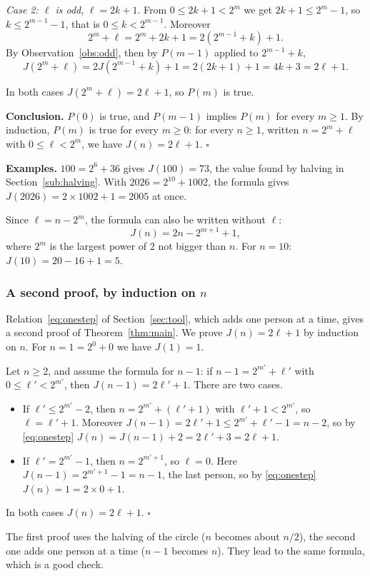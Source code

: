 \emph{Case 2: $\ell$ is odd}, $\ell=2k+1$. From $0\leq2k+1<2^m$ we get
$2k+1\leq2^m-1$, so $k\leq2^{m-1}-1$, that is $0\leq k<2^{m-1}$. Moreover
\[
2^m+\ell=2^m+2k+1=2\left(2^{m-1}+k\right)+1 .
\]
By Observation~\ref{obs:odd}, then by $P(m-1)$ applied to $2^{m-1}+k$,
\[
J(2^m+\ell)=2J\!\left(2^{m-1}+k\right)+1=2(2k+1)+1=4k+3=2\ell+1 .
\]

In both cases $J(2^m+\ell)=2\ell+1$, so $P(m)$ is true.

\textbf{Conclusion.} $P(0)$ is true, and $P(m-1)$ implies $P(m)$ for every
$m\geq1$. By induction, $P(m)$ is true for every $m\geq0$: for every $n\geq1$,
written $n=2^m+\ell$ with $0\leq\ell<2^m$, we have $J(n)=2\ell+1$.
\hfill$\square$

\textbf{Examples.} $100=2^6+36$ gives $J(100)=73$, the value found by halving
in Section~\ref{sub:halving}. With $2026=2^{10}+1002$, the formula gives
$J(2026)=2\times1002+1=2005$ at once.

Since $\ell=n-2^m$, the formula can also be written without $\ell$:
\[
J(n)=2n-2^{m+1}+1,
\]
where $2^m$ is the largest power of $2$ not bigger than $n$. For $n=10$:
$J(10)=20-16+1=5$.

\subsubsection{A second proof, by induction on \texorpdfstring{$n$}{n}}

Relation~\eqref{eq:onestep} of Section~\ref{sec:tool}, which adds one person
at a time, gives a second proof of Theorem~\ref{thm:main}. We prove
$J(n)=2\ell+1$ by induction on $n$. For $n=1=2^0+0$ we have $J(1)=1$.

Let $n\geq2$, and assume the formula for $n-1$: if $n-1=2^{m'}+\ell'$ with
$0\leq\ell'<2^{m'}$, then $J(n-1)=2\ell'+1$. There are two cases.
\begin{itemize}
  \item If $\ell'\leq2^{m'}-2$, then $n=2^{m'}+(\ell'+1)$ with
        $\ell'+1<2^{m'}$, so $\ell=\ell'+1$. Moreover
        $J(n-1)=2\ell'+1\leq2^{m'}+\ell'-1=n-2$, so by \eqref{eq:onestep}
        $J(n)=J(n-1)+2=2\ell'+3=2\ell+1$.
  \item If $\ell'=2^{m'}-1$, then $n=2^{m'+1}$, so $\ell=0$. Here
        $J(n-1)=2^{m'+1}-1=n-1$, the last person, so by \eqref{eq:onestep}
        $J(n)=1=2\times0+1$.
\end{itemize}
In both cases $J(n)=2\ell+1$. \hfill$\square$

The first proof uses the halving of the circle ($n$ becomes about $n/2$), the
second one adds one person at a time ($n-1$ becomes $n$). They lead to the
same formula, which is a good check.

